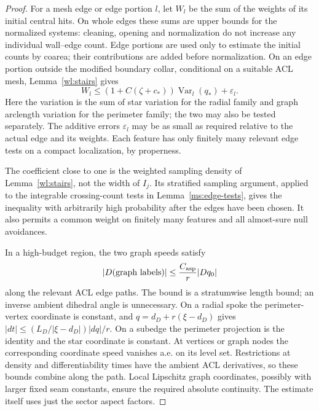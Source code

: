 \begin{proof}
For a mesh edge or edge portion $l$, let $W_l$ be the sum of the
weights of its initial central hits.  On whole edges these sums
are upper bounds for the normalized systems: cleaning, opening and
normalization do not increase any individual wall--edge count.
Edge portions are used only to estimate the initial counts by
coarea; their contributions are added before normalization.
On an edge portion outside the modified
boundary collar, conditional on a suitable ACL mesh,
Lemma~\ref{wl:stairs} gives
\begin{equation}\label{ha:weighted-coarea}
 W_l\le(1+C(\zeta+c_*))\operatorname{Var}_l(q_*)+\varepsilon_l.
\end{equation}
Here the variation is the sum of star variation for the radial family
and graph arclength variation for the perimeter family; the two may
also be tested separately.  The additive errors $\varepsilon_l$ may
be as small as required relative to the actual edge and its weights.
Each feature has only finitely many relevant edge tests on a compact
localization, by properness.

The coefficient close to one is the weighted sampling density of
Lemma~\ref{wl:stairs}, not the width of $I_j$.  Its stratified
sampling argument, applied to the integrable crossing-count tests
in Lemma~\ref{ms:edge-tests}, gives the inequality with arbitrarily
high probability after the edges have been chosen.  It also permits
a common weight on finitely many features and all almost-sure null
avoidances.

In a high-budget region, the two graph speeds satisfy
\begin{equation}\label{ha:graph-speed}
                 |D(\hbox{graph labels})|
                    \le \frac{C_{\mathrm{asp}}}{r}|Dq_0|
\end{equation}
along the relevant ACL edge paths.  The bound is a stratumwise length
bound; an inverse ambient dihedral angle is unnecessary.  On a radial
spoke the perimeter-vertex coordinate is constant, and
$q=d_D+r(\xi-d_D)$ gives
$|dt|\le (L_D/|\xi-d_D|)|dq|/r$.  On a subedge the perimeter
projection is the identity and the star coordinate is constant.
At vertices or graph nodes the corresponding coordinate speed
vanishes a.e. on its level set.  Restrictions at density and
differentiability times have the ambient ACL derivatives, so these
bounds combine along the path.  Local Lipschitz graph coordinates,
possibly with larger fixed seam constants, ensure the required
absolute continuity.  The estimate itself uses just the sector
aspect factors.


\end{proof}
